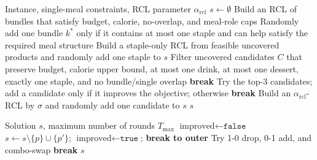 \documentclass[a4paper]{article}
\begin{document}
\begin{algorithm}[H]
\caption{Greedy Randomized Construction (GRC) sub-procedure}
\label{alg:grc}
\begin{algorithmic}[1]
\Require Instance, single-meal constraints, RCL parameter $\alpha_{\text{rcl}}$
\State $s \gets \emptyset$
    \State Build an RCL of bundles that satisfy budget, calorie, no-overlap, and meal-role caps
    \State Randomly add one bundle $k^*$ only if it contains at most one staple and can help satisfy the required meal structure
\EndIf
{}
    \State Build a staple-only RCL from feasible uncovered products and randomly add one staple to $s$
\EndIf
{}
    \State Filter uncovered candidates $C$ that preserve budget, calorie upper bound, at most one drink, at most one dessert, exactly one staple, and no bundle/single overlap
     \textbf{break} \EndIf
        \State Try the top-3 candidates; add a candidate only if it improves the objective; otherwise \textbf{break}
    \Else
        \State Build an $\alpha_{\text{rcl}}$-RCL by $\sigma$ and randomly add one candidate to $s$
    \EndIf
\EndWhile
\State \Return $s$
\end{algorithmic}
\end{algorithm}

\begin{algorithm}[H]
\caption{Local Search (1-1 swap / 1-0 drop / 0-1 add / combo-swap)}
\label{alg:ls}
\begin{algorithmic}[1]
\Require Solution $s$, maximum number of rounds $T_{\max}$
  \State $\text{improved} \gets \texttt{false}$
      \State $s \gets s\setminus\{p\}\cup\{p'\}$; $\text{improved}\gets\texttt{true}$; \textbf{break to outer}
    \EndIf
  \EndFor
   Try 1-0 drop, 0-1 add, and combo-swap \EndIf
   \textbf{break} \EndIf
\EndFor
\State \Return $s$
\end{algorithmic}
\end{algorithm}
\end{document}
